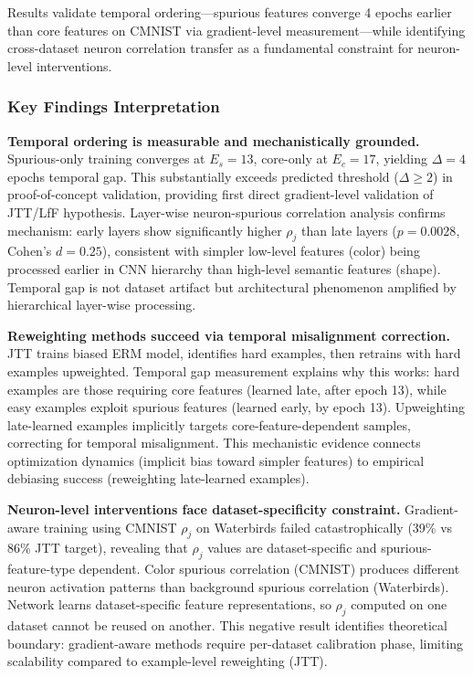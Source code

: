 
Results validate temporal ordering---spurious features converge 4 epochs earlier than core features on CMNIST via gradient-level measurement---while identifying cross-dataset neuron correlation transfer as a fundamental constraint for neuron-level interventions.

\subsubsection{Key Findings Interpretation}

\textbf{Temporal ordering is measurable and mechanistically grounded.} Spurious-only training converges at $E_s=13$, core-only at $E_c=17$, yielding $\Delta=4$ epochs temporal gap. This substantially exceeds predicted threshold ($\Delta \geq 2$) in proof-of-concept validation, providing first direct gradient-level validation of JTT/LfF hypothesis. Layer-wise neuron-spurious correlation analysis confirms mechanism: early layers show significantly higher $\rho_j$ than late layers ($p=0.0028$, Cohen's $d=0.25$), consistent with simpler low-level features (color) being processed earlier in CNN hierarchy than high-level semantic features (shape). Temporal gap is not dataset artifact but architectural phenomenon amplified by hierarchical layer-wise processing.

\textbf{Reweighting methods succeed via temporal misalignment correction.} JTT trains biased ERM model, identifies hard examples, then retrains with hard examples upweighted. Temporal gap measurement explains why this works: hard examples are those requiring core features (learned late, after epoch 13), while easy examples exploit spurious features (learned early, by epoch 13). Upweighting late-learned examples implicitly targets core-feature-dependent samples, correcting for temporal misalignment. This mechanistic evidence connects optimization dynamics (implicit bias toward simpler features) to empirical debiasing success (reweighting late-learned examples).

\textbf{Neuron-level interventions face dataset-specificity constraint.} Gradient-aware training using CMNIST $\rho_j$ on Waterbirds failed catastrophically (39\% vs 86\% JTT target), revealing that $\rho_j$ values are dataset-specific and spurious-feature-type dependent. Color spurious correlation (CMNIST) produces different neuron activation patterns than background spurious correlation (Waterbirds). Network learns dataset-specific feature representations, so $\rho_j$ computed on one dataset cannot be reused on another. This negative result identifies theoretical boundary: gradient-aware methods require per-dataset calibration phase, limiting scalability compared to example-level reweighting (JTT).

